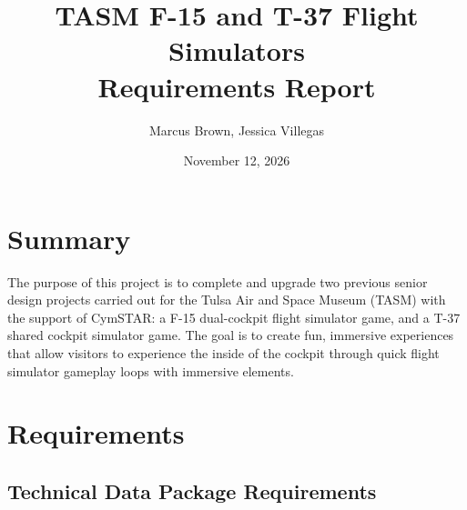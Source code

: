 \documentclass[12pt]{article} %
\title{TASM F-15 and T-37 Flight Simulators\\Requirements Report}
\author{Marcus Brown, Jessica Villegas}
\date{November 12, 2026} %
\begin{document}
\maketitle

\section{Summary}

The purpose of this project is to complete and upgrade two previous senior design projects carried out for the Tulsa Air and Space Museum (TASM) with the support of CymSTAR: a F-15 dual-cockpit flight simulator game, and a T-37 shared cockpit simulator game. The goal is to create fun, immersive  experiences that allow visitors to experience the inside of the cockpit through quick flight simulator gameplay loops with immersive elements. 

\section{Requirements} 

\subsection{Technical Data Package Requirements}
\end{document}
